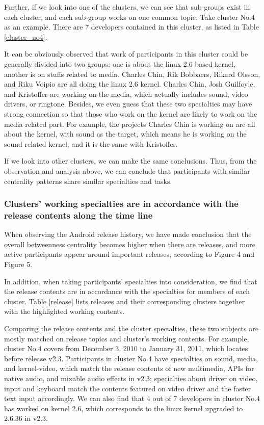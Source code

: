 \documentclass[10pt, conference, compsocconf]{IEEEtran}
\begin{document}
Further, if we look into one of the clusters, we can see that
sub-groups exist in each cluster, and each sub-group works on one
common topic. Take cluster No.4 as an example. There are 7 developers
contained in this cluster, as listed in Table \ref{cluster_no4}.


It can be obviously observed that work of participants in this cluster
could be generally divided into two groups: one is about the linux 2.6
based kernel, another is on stuffs related to media. Charles Chin, Rik
Bobbaers, Rikard Olsson, and Riku Voipio are all doing the linux 2.6
kernel. Charles Chin, Josh Guilfoyle, and Kristoffer are working on
the media, which actually includes sound, video drivers, or
ringtone. Besides, we even guess that these two specialties may have
strong connection so that those who work on the kernel are likely to
work on the media related part. For example, the projects Charles Chin
is working on are all about the kernel, with sound as the target,
which means he is working on the sound related kernel, and it is the
same with Kristoffer.


If we look into other clusters, we can make the same conclusions.
Thus, from the observation and analysis above, we can conclude that
participants with similar centrality patterns share similar
specialties and tasks.


\subsubsection{Clusters' working specialties are in accordance with the release contents along the time line}

When observing the Android release history, we have made conclusion
that the overall betweenness centrality becomes higher when there are
releases, and more active participants appear around important
releases, according to Figure 4 and Figure 5.


In addition, when taking participants' specialties into consideration,
we find that the release contents are in accordance with the
specialties for members of each cluster. Table \ref{release} lists
releases and their corresponding clusters together with the
highlighted working contents.


Comparing the release contents and the cluster specialties, these two
subjects are mostly matched on release topics and cluster's working
contents. For example, cluster No.4 covers from December 3, 2010 to
January 31, 2011, which locates before release v2.3. Participants in
cluster No.4 have specialties on sound, media, and kernel-video, which
match the release contents of new multimedia, APIs for native audio,
and mixable audio effects in v2.3; specialties about driver on video,
input and keyboard match the contents featured on video driver and the
faster text input accordingly. We can also find that 4 out of 7
developers in cluster No.4 has worked on kernel 2.6, which corresponds
to the linux kernel upgraded to 2.6.36 in v2.3.
\end{document}
